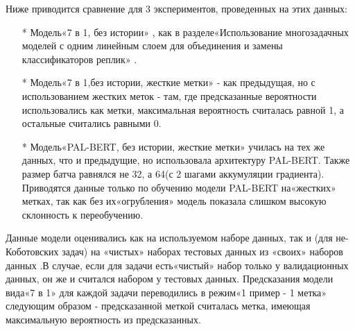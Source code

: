 Ниже приводится сравнение для 3 экспериментов, проведенных на этих данных:
\begin{itemize}
\item[*] Модель«7 в 1, без истории» , как в разделе«Использование многозадачных моделей с одним линейным слоем для объединения и замены классификаторов реплик» .
\item[*] Модель«7 в 1,без истории, жесткие метки» - как предыдущая, но с использованием жестких меток - там, где предсказанные вероятности использовались как метки, максимальная вероятность считалась равной 1, а остальные считались равными 0.
\item[*] Модель«PAL-BERT, без истории, жесткие метки» училась на тех же данных, что и предыдущие, но использовала архитектуру PAL-BERT. Также размер батча равнялся не 32, а 64(с 2 шагами аккумуляции градиента). Приводятся данные только по обучению модели PAL-BERT на«жестких» метках, так как без их«огрубления» модель показала слишком высокую склонность к переобучению.
\end{itemize}
Данные модели оценивались как на используемом наборе данных, так и (для не-Коботовских задач) на «чистых» наборах тестовых данных из «своих» наборов данных .В случае, если для задачи есть«чистый» набор только у валидационных данных, он же и считался набором у тестовых данных.
Предсказания модели вида«7 в 1» для каждой задачи переводились в режим«1 пример - 1 метка» следующим образом - предсказанной меткой считалась метка, имеющая максимальную вероятность из предсказанных.

